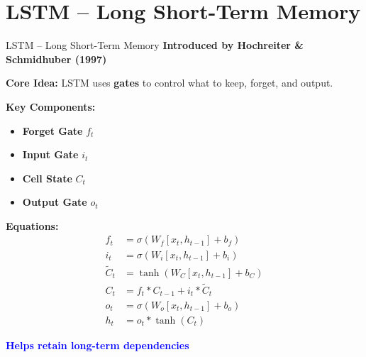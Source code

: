 \section{LSTM – Long Short-Term Memory}
\begin{frame}[allowframebreaks]{LSTM – Long Short-Term Memory}
    \textbf{Introduced by Hochreiter \& Schmidhuber (1997)}

    \vspace{1em}
    \textbf{Core Idea:} LSTM uses \textbf{gates} to control what to keep, forget, and output.

    \vspace{1em}
    \textbf{Key Components:}
    \begin{itemize}
        \item \textbf{Forget Gate} $f_t$
        \item \textbf{Input Gate} $i_t$
        \item \textbf{Cell State} $C_t$
        \item \textbf{Output Gate} $o_t$
    \end{itemize}

\framebreak
    \textbf{Equations:}
    \begin{align*}
        f_t &= \sigma(W_f[x_t, h_{t-1}] + b_f) \\
        i_t &= \sigma(W_i[x_t, h_{t-1}] + b_i) \\
        \tilde{C}_t &= \tanh(W_C[x_t, h_{t-1}] + b_C) \\
        C_t &= f_t * C_{t-1} + i_t * \tilde{C}_t \\
        o_t &= \sigma(W_o[x_t, h_{t-1}] + b_o) \\
        h_t &= o_t * \tanh(C_t)
    \end{align*}

    \vspace{1em}
    \textcolor{blue}{\textbf{Helps retain long-term dependencies}}
\end{frame}


